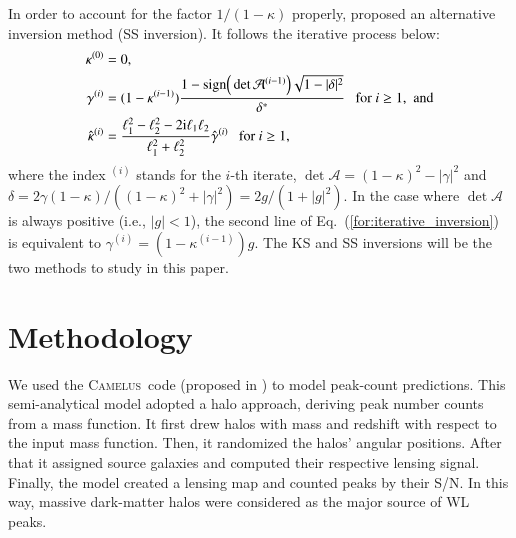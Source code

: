 \documentclass{aa} %
\newcommand{\for}[1]{Eq.~(\ref{#1})}
\newcommand{\upp}[1]{^{(#1)}}
\newcommand{\rmi}{\mathrm{i}}   \newcommand{\rmv}{\mathrm{v}}
\newcommand{\PaperI}{\citetalias{Lin_Kilbinger_2015}}
\newcommand{\Camelus}{\textsc{Camelus}}
\begin{document}
In order to account for the factor $1/(1-\kappa)$ properly, \citet{Seitz_Schneider_1995} proposed an alternative inversion method (SS inversion). It follows the iterative process below:
\begin{align}
        \kappa\upp{0} &= 0, \notag\\
        \gamma\upp{i} &= (1-\kappa\upp{i-1})\frac{1-\text{sign}\Big(\det\mathcal{A}\upp{i-1}\Big)\sqrt{1-|\delta|^2}}{\delta^*} \ \ \ \text{for $i\geq1$,\ \ and} \notag\\
        \hat{\kappa}\upp{i} &= \frac{\ell_1^2 - \ell_2^2 - 2\rmi\ell_1\ell_2}{\ell_1^2 + \ell_2^2} \hat{\gamma}\upp{i} \ \ \ \text{for $i\geq1$}, \label{for:iterative_inversion}
\end{align}
where the index $\upp{i}$ stands for the $i$-th iterate, $\det\mathcal{A} = (1-\kappa)^2 - |\gamma|^2$ and $\delta = 2\gamma(1-\kappa)/((1-\kappa)^2+|\gamma|^2) = 2g/(1+|g|^2)$. In the case where $\det\mathcal{A}$ is always positive (i.e., $|g| < 1$), the second line of \for{for:iterative_inversion} is equivalent to $\gamma\upp{i} = (1-\kappa\upp{i-1})g$. The KS and SS inversions will be the two methods to study in this paper.


\section{Methodology}
\label{sect:methodology}

We used the \Camelus\ code (proposed in \PaperI) to model peak-count predictions. This semi-analytical model adopted a halo approach, deriving peak number counts from a mass function. It first drew halos with mass and redshift with respect to the input mass function. Then, it randomized the halos' angular positions. After that it assigned source galaxies and computed their respective lensing signal. Finally, the model created a lensing map and counted peaks by their S/N. In this way, massive dark-matter halos were considered as the major source of WL peaks.
\end{document}
